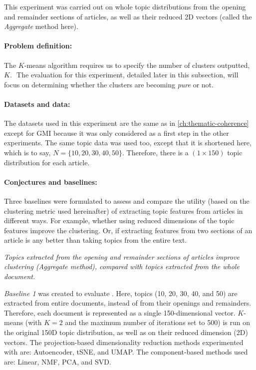 This experiment was carried out on whole topic distributions from the opening and remainder sections of articles, as well as their reduced 2D vectors (called the \emph{Aggregate} method here).

\paragraph{Problem definition:}The $K$-means algorithm requires us to specify the number of clusters outputted, $K$.  The evaluation for this experiment, detailed later in this subsection, will focus on determining whether the clusters are becoming \emph{pure} or not.

\paragraph{Datasets and data:}The datasets used in this experiment are the same as in \autoref{ch:thematic-coherence} except for GMI because it was only considered as a first step in the other experiments. The same topic data was used too, except that it is shortened here, which is to say, $N = \{ 10, 20, 30, 40, 50 \}$. Therefore, there is a $(1 \times 150)$ topic distribution for each article.

\paragraph{Conjectures and baselines:}Three baselines were formulated to assess and compare the utility (based on the clustering metric used hereinafter) of extracting topic features from articles in different ways. For example, whether using reduced dimensions of the topic features improve the clustering. Or, if extracting features from two sections of an article is any better than taking topics from the entire text.

\begin{con}
  \label{con:a}\textit{Topics extracted from the opening and remainder sections of articles improve clustering (Aggregate method), compared with topics extracted from the whole document.}
\end{con}

\emph{Baseline 1} was created to evaluate . Here, topics (10, 20, 30, 40, and 50) are extracted from entire documents, instead of from their openings and remainders. Therefore, each document is represented as a single 150-dimensional vector. $K$-means (with $K = 2$ and the maximum number of iterations set to 500) is run on the original 150D topic distribution, as well as on their reduced dimension (2D) vectors. The projection-based dimensionality reduction methods experimented with are: Autoencoder, \ac{tSNE}, and \ac{UMAP}. The component-based methods used are: Linear, \ac{NMF}, \ac{PCA}, and \ac{SVD}.

